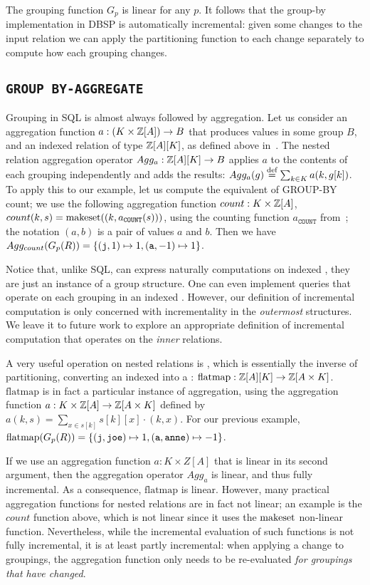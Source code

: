 The grouping function $G_p$ is linear for any $p$.
It follows that the group-by implementation in DBSP is automatically
incremental: given some changes
to the input relation we can apply the partitioning function
to each change separately to compute how each grouping changes.

\subsection{\texttt{GROUP BY-AGGREGATE}}

Grouping in SQL is almost always followed by aggregation.
Let us consider an aggregation function $a: (K \times \mathbb{Z}[A]) \to B$ that produces values
in some group $B$, and an indexed relation of type $\mathbb{Z}[A][K]$, as defined above in~.
The nested relation aggregation operator $Agg_a: \mathbb{Z}[A][K] \to B$ applies $a$
to the contents of each grouping independently and adds the results:
$Agg_a(g) \stackrel{\textrm{\scriptsize def}}{=} \sum_{k \in K} a(k, g[k])$.  To apply this
to our example, let us compute the equivalent of GROUP-BY count; we use
the following aggregation function $count: K \times \mathbb{Z}[A]$, $count(k, s) =
\mbox{makeset}((k, a_\texttt{COUNT}(s)))$, using the \zr counting function $a_\texttt{COUNT}$
from~; the notation $(a,b)$ is a pair of values $a$ and $b$.
Then we have $Agg_{count} (G_p(R)) = \{ (\mbox{\texttt{j}}, 1) \mapsto 1,
(\mbox{\texttt{a}}, -1) \mapsto 1 \}$.

Notice that, unlike SQL, \dbsp can express naturally computations
on indexed \zrs, they are just an instance of a group structure.
One can even implement queries that operate on each grouping
in an indexed \zr.  However, our definition of incremental
computation is only concerned with incrementality in the
\emph{outermost} structures.  We leave it to future work to
explore an appropriate definition of incremental computation that
operates on the \emph{inner} relations.

A very useful operation on nested relations is , which is
essentially the inverse of partitioning, converting an indexed
\zr into a \zr: $\mbox{flatmap}: \mathbb{Z}[A][K] \to \mathbb{Z}[A \times K]$.
$\mbox{flatmap}$ is in fact a particular instance of aggregation,
using the aggregation function $a: K \times \mathbb{Z}[A] \to \mathbb{Z}[A \times K]$
defined by $a(k, s) = \sum_{x \in s[k]} s[k][x] \cdot (k, x).$
For our previous example, $\mbox{flatmap}(G_p(R)) = \{ (\mbox{\texttt{j}}, \mbox{\texttt{joe}}) \mapsto 1,
(\mbox{\texttt{a}}, \mbox{\texttt{anne}}) \mapsto -1 \}$.

If we use an aggregation function $a: K \times Z[A]$ that is linear in its
second argument, then the aggregation operator $Agg_a$ is linear, and
thus fully incremental.  As a consequence, $\mbox{flatmap}$ is linear.
However, many practical aggregation functions for nested relations are in fact
not linear; an example is the $count$ function above, which is not linear
since it uses the $\mbox{makeset}$ non-linear function.  Nevertheless, while
the incremental evaluation of such functions is not fully incremental,
it is at least partly incremental: when applying a change to groupings, the aggregation
function only needs to be re-evaluated \emph{for groupings that have changed}.


